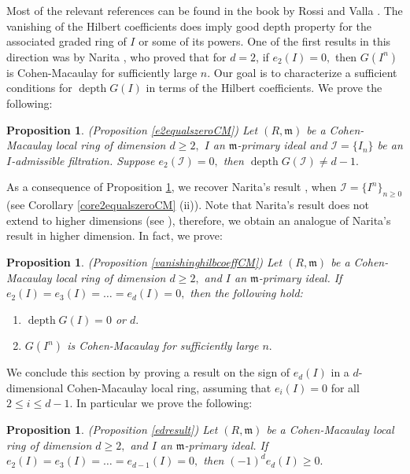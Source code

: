 \documentclass[reqno,a4paper,dvipsnames]{amsart}
\newcommand{\m}{\mathfrak{m} }
\newcommand{\depth}{\operatorname{depth}}
\newtheorem{proposition}[theorem]{Proposition}
\theoremstyle{definition}
\begin{document}
  Most of the relevant references can be found in the book by Rossi and Valla \cite{rv}.  
The vanishing of the Hilbert coefficients does imply good   depth  property for the associated graded ring of $I$ or some of  its powers. 
One of the first results in this direction was by  Narita \cite[Theorem 1]{narita}, who proved that for $d=2$, if $e_{2}(I)=0,$ then $G(I^{n})$ is Cohen-Macaulay for sufficiently large $n.$ 
Our goal is to characterize a sufficient conditions for  $\depth G(I)$ in terms of the Hilbert coefficients. 
We prove the following:
\begin{proposition} \label{prop1.2} (Proposition \ref{e2equalszeroCM})
   Let $(R, \m)$ be a Cohen-Macaulay local ring of dimension $d \geq 2,$ $I$ an $\m$-primary ideal and $\mathcal{I}=\{I_{n}\}$ be an $I$-admissible filtration. Suppose $e_{2}(\mathcal{I})=0,$ then $\depth G(\mathcal{I}) \neq d-1.$
\end{proposition}
As a consequence of Proposition  \ref{prop1.2}, we recover Narita's result  \cite[Theorem 1]{narita}, when $\mathcal{I}=\{I^{n}\}_{n \geq 0}$ (see Corollary \ref{core2equalszeroCM} (ii)). Note that Narita's  result does not extend to higher dimensions (see \cite[Example 6.3]{tjp2}), therefore, we obtain an analogue  of Narita's result \cite[Theorem 1]{narita} in higher dimension. In fact, we prove: 
\begin{proposition} \label{prop1.5}  (Proposition \ref{vanishinghilbcoeffCM})
       Let $(R, \m)$ be a Cohen-Macaulay local ring of dimension $d \geq 2,$ and $I$ an $\m$-primary ideal. If $e_{2}(I)=e_{3}(I)=\ldots=e_{d}(I)=0,$ then  the following hold:
       \begin{enumerate}[\normalfont(i)]
           \item  $\depth G(I) = 0$ or $d.$
           \item  $G(I^{n})$ is Cohen-Macaulay for sufficiently large $n.$
       \end{enumerate}
       \end{proposition}
 We conclude this section by proving a result on the sign of  $e_{d}(I)$ in a $d$-dimensional Cohen-Macaulay local ring, assuming  that $e_{i}(I)=0$ for all $2 \leq i \leq d-1$. In particular we prove the following:
  \begin{proposition} (Proposition \ref{edresult}) \label{prop1.6}
     Let $(R, \m)$ be a Cohen-Macaulay local ring of dimension $d \geq 2,$ and $I$ an $\m$-primary ideal. If $e_{2}(I)=e_{3}(I)=\ldots=e_{d-1}(I)=0,$ then $(-1)^{d}e_{d}(I) \geq 0.$
\end{proposition}
\end{document}

